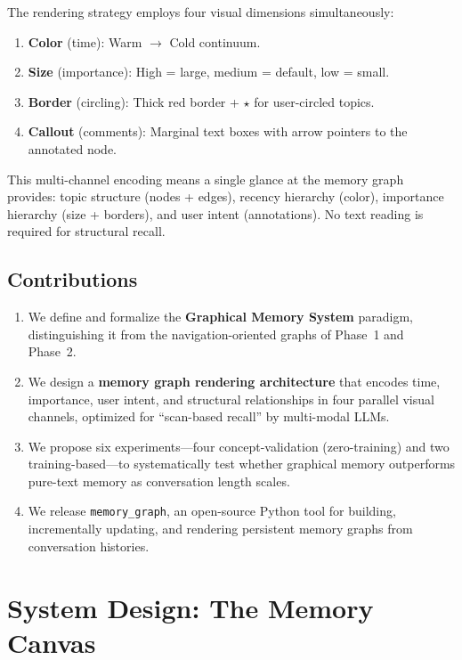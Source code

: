 \documentclass[11pt,a4paper]{article}
\begin{document}
The rendering strategy employs four visual dimensions simultaneously:
\begin{enumerate}[nosep]
\item \textbf{Color} (time): Warm $\rightarrow$ Cold continuum.
\item \textbf{Size} (importance): High = large, medium = default, low = small.
\item \textbf{Border} (circling): Thick red border + $\star$ for user-circled topics.
\item \textbf{Callout} (comments): Marginal text boxes with arrow pointers to the annotated node.
\end{enumerate}

This multi-channel encoding means a single glance at the memory graph provides: topic structure (nodes + edges), recency hierarchy (color), importance hierarchy (size + borders), and user intent (annotations). No text reading is required for structural recall.

\subsection{Contributions}

\begin{enumerate}[nosep]
\item We define and formalize the \textbf{Graphical Memory System} paradigm, distinguishing it from the navigation-oriented graphs of Phase~1 and Phase~2.
\item We design a \textbf{memory graph rendering architecture} that encodes time, importance, user intent, and structural relationships in four parallel visual channels, optimized for ``scan-based recall'' by multi-modal LLMs.
\item We propose six experiments---four concept-validation (zero-training) and two training-based---to systematically test whether graphical memory outperforms pure-text memory as conversation length scales.
\item We release \texttt{memory\_graph}, an open-source Python tool for building, incrementally updating, and rendering persistent memory graphs from conversation histories.
\end{enumerate}


\section{System Design: The Memory Canvas}
\end{document}
